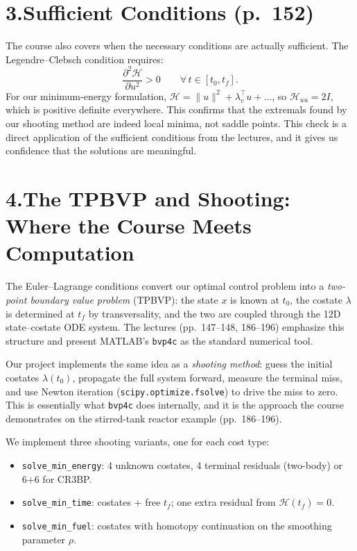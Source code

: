 \documentclass[11pt,letterpaper]{article}
\begin{document}
\section{3.\quad Sufficient Conditions (p.~152)}

The course also covers when the necessary conditions are actually sufficient. The Legendre--Clebsch condition requires:
\[
  \frac{\partial^2 \mathcal{H}}{\partial u^2} > 0
  \qquad \forall\, t \in [t_0, t_f].
\]
For our minimum-energy formulation, $\mathcal{H} = \|u\|^2 + \lambda_v^\top u + \ldots$, so $\mathcal{H}_{uu} = 2I$, which is positive definite everywhere. This confirms that the extremals found by our shooting method are indeed local minima, not saddle points. This check is a direct application of the sufficient conditions from the lectures, and it gives us confidence that the solutions are meaningful.


\section{4.\quad The TPBVP and Shooting: Where the Course Meets Computation}

The Euler--Lagrange conditions convert our optimal control problem into a \emph{two-point boundary value problem} (TPBVP): the state $x$ is known at $t_0$, the costate $\lambda$ is determined at $t_f$ by transversality, and the two are coupled through the 12D state--costate ODE system. The lectures (pp.~147--148, 186--196) emphasize this structure and present MATLAB's \texttt{bvp4c} as the standard numerical tool.

Our project implements the same idea as a \emph{shooting method}: guess the initial costates $\lambda(t_0)$, propagate the full system forward, measure the terminal miss, and use Newton iteration (\texttt{scipy.optimize.fsolve}) to drive the miss to zero. This is essentially what \texttt{bvp4c} does internally, and it is the approach the course demonstrates on the stirred-tank reactor example (pp.~186--196).

We implement three shooting variants, one for each cost type:
\begin{itemize}[leftmargin=1.5em]
  \item \texttt{solve\_min\_energy}: 4 unknown costates, 4 terminal residuals (two-body) or 6+6 for CR3BP.
  \item \texttt{solve\_min\_time}: costates + free $t_f$; one extra residual from $\mathcal{H}(t_f) = 0$.
  \item \texttt{solve\_min\_fuel}: costates with homotopy continuation on the smoothing parameter $\rho$.
\end{itemize}
\end{document}
